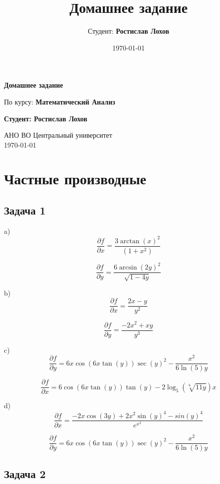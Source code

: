 \documentclass[a4paper,12pt]{article}
\title{Домашнее задание}
\author{Студент: \textbf{Ростислав Лохов}}
\date{\today}
\begin{document}
\begin{titlepage}
    \centering
    \vspace*{1cm}

    \Huge
    \textbf{Домашнее задание}

    \vspace{0.5cm}
    \LARGE
    По курсу: \textbf{Математический Анализ}

    \vspace{1.5cm}

    \textbf{Студент: Ростислав Лохов}

    \vfill

    \Large
    АНО ВО Центральный университет\\
    \vspace{0.3cm}
    \today

\end{titlepage}

\tableofcontents
\newpage

\section{Частные производные}

\subsection{Задача 1}

a)
\[
\frac{\partial f}{\partial x} = \frac{3\arctan(x)^2}{(1+x^2)}
\]

\[
\frac{\partial f}{\partial y} = \frac{6\arcsin(2y)^2}{\sqrt{1-4y}}
\]

b)
\[
\frac{\partial f}{\partial x} = \frac{2x-y}{y^2}
\]

\[
\frac{\partial f}{\partial y} = \frac{-2x^2+xy}{y^3}
\]

c) 
\[
\frac{\partial f}{\partial y} = 6x \cos(6x \tan(y)) \sec(y)^2 - \frac{x^2}{6\ln(5)y}
\]

\[
\frac{\partial f}{\partial x} = 6\cos(6x\tan(y))\tan(y) - 2\log_{5}(\sqrt[6]{11y})x
\]

d)
\[
\frac{\partial f}{\partial x} = \frac{-2x\cos(3y)+2x^2\sin(y)^4-sin(y)^4}{e^{x^2}}
\]

\[
\frac{\partial f}{\partial y} = 6x\cos(6x\tan(y))\sec(y)^2-\frac{x^2}{6\ln(5)y}
\]

\subsection{Задача 2}
\end{document}
